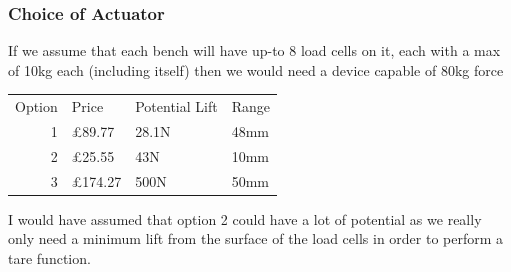 \documentclass[11pt]{article}
\begin{document}
\subsubsection{Choice of Actuator}
\label{sec-1-1-2}

If we assume that each bench will have up-to 8 load cells on it, each with a max of 10kg each (including itself) 
then we would need a device capable of 80kg force

\begin{center}
\begin{tabular}{rlll}
Option & Price & Potential Lift & Range\\
1 & £89.77 & 28.1N & 48mm\\
2 & £25.55 & 43N & 10mm\\
3 & £174.27 & 500N & 50mm\\
\end{tabular}
\end{center}

I would have assumed that option 2 could have a lot of potential as we really only need a minimum lift 
from the surface of the load cells in order to perform a tare function. 
\end{document}
